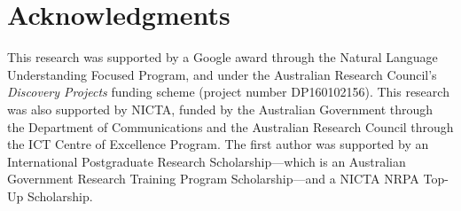\documentclass[11pt,letterpaper]{article}
\begin{document}
\section*{Acknowledgments} 

This research was supported by a Google award through the Natural  Language Understanding Focused Program, and under the Australian  Research Council's {\em Discovery Projects} funding scheme (project number DP160102156). This research was also supported by NICTA, funded by the Australian Government through the Department of Communications and the Australian Research Council through the ICT Centre of Excellence Program. 
The first author  was supported by  an International Postgraduate Research Scholarship---which is an Australian Government Research Training Program Scholarship---and a NICTA NRPA Top-Up Scholarship.





\end{document}
